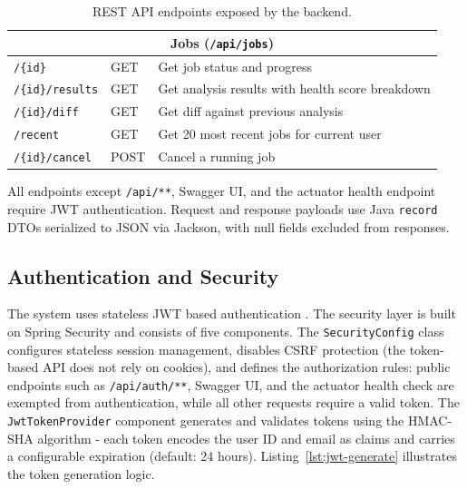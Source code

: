 \begin{table}[htbp]
\begin{tabular}{|l|l|p{6cm}|}
        \hline\hline
        \multicolumn{3}{|c|}{\textbf{Jobs} (\texttt{/api/jobs})} \\
        \hline
        \texttt{/\{id\}}           & GET             & Get job status and progress                      \\
        \hline
        \texttt{/\{id\}/results}   & GET             & Get analysis results with health score breakdown \\
        \hline
        \texttt{/\{id\}/diff}      & GET             & Get diff against previous analysis               \\
        \hline
        \texttt{/recent}           & GET             & Get 20 most recent jobs for current user         \\
        \hline
        \texttt{/\{id\}/cancel}    & POST            & Cancel a running job                             \\
        \hline
    \end{tabular}
    \caption{REST API endpoints exposed by the backend.}
    \label{tab:api-endpoints}
\end{table}

All endpoints except \texttt{/api/**}, Swagger UI, and the actuator health endpoint require JWT authentication. Request and response payloads use Java \texttt{record} DTOs serialized to JSON via Jackson, with null fields excluded from responses.

\subsection{Authentication and Security}
\label{subsec:auth-security}

\par The system uses stateless JWT based authentication \cite{RFC7519}. The security layer is built on Spring Security and consists of five components. The \texttt{SecurityConfig} class configures stateless session management, disables CSRF protection (the token-based API does not rely on cookies), and defines the authorization rules: public endpoints such as \texttt{/api/auth/**}, Swagger UI, and the actuator health check are exempted from authentication, while all other requests require a valid token. The \texttt{JwtTokenProvider} component generates and validates tokens using the HMAC-SHA algorithm \cite{RFC4634} - each token encodes the user ID and email as claims and carries a configurable expiration (default: 24 hours). Listing~\ref{lst:jwt-generate} illustrates the token generation logic.

